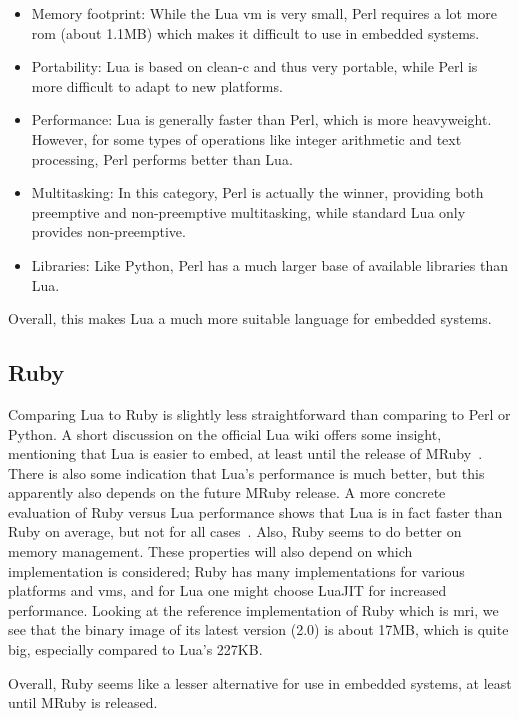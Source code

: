 \begin{itemize}
	\item{Memory footprint:} While the Lua \gls{vm} is very small, Perl requires a lot more \gls{rom} (about 1.1MB) which makes it difficult to use in embedded systems.
	\item{Portability:} Lua is based on \gls{clean-c} and thus very portable, while Perl is more difficult to adapt to new platforms.
	\item{Performance:} Lua is generally faster than Perl, which is more heavyweight. However, for some types of operations like integer arithmetic and text processing, Perl performs better than Lua.
	\item{Multitasking:} In this category, Perl is actually the winner, providing both preemptive and non-preemptive multitasking, while standard Lua only provides non-preemptive.
	\item{Libraries:} Like Python, Perl has a much larger base of available libraries than Lua.
\end{itemize}

\noindent
Overall, this makes Lua a much more suitable language for embedded systems.

\subsection{Ruby}
\label{sec:lua_vs_ruby}
Comparing Lua to Ruby is slightly less straightforward than comparing to Perl or Python. A short discussion on the official Lua wiki offers some insight, mentioning that Lua is easier to embed, at least until the release of MRuby~\cite{website:lua_wiki_ruby}. There is also some indication that Lua's performance is much better, but this apparently also depends on the future MRuby release. A more concrete evaluation of Ruby versus Lua performance shows that Lua is in fact faster than Ruby on average, but not for all cases~\cite{website:computer_language_benchmarks_game}. Also, Ruby seems to do better on memory management. These properties will also depend on which implementation is considered; Ruby has many implementations for various platforms and \glspl{vm}, and for Lua one might choose LuaJIT for increased performance. Looking at the reference implementation of Ruby which is \gls{mri}, we see that the binary image of its latest version (2.0) is about 17MB, which is quite big, especially compared to Lua's 227KB.

\noindent
Overall, Ruby seems like a lesser alternative for use in embedded systems, at least until MRuby is released.

